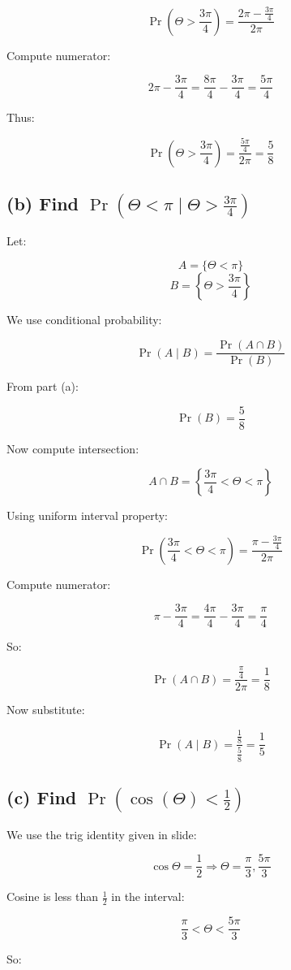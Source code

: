 \documentclass{article}
\begin{document}
\[
\Pr\left(\Theta>\frac{3\pi}{4}\right)=\frac{2\pi-\frac{3\pi}{4}}{2\pi}
\]

Compute numerator:

\[
2\pi-\frac{3\pi}{4}=\frac{8\pi}{4}-\frac{3\pi}{4}=\frac{5\pi}{4}
\]

Thus:

\[
\Pr\left(\Theta>\frac{3\pi}{4}\right)=\frac{\frac{5\pi}{4}}{2\pi}=\frac{5}{8}
\]

\subsection*{(b) Find $\Pr\left(\Theta<\pi\mid \Theta>\frac{3\pi}{4}\right)$}
Let:

\[
A=\{\Theta<\pi\}
\]
\[
B=\left\{\Theta>\frac{3\pi}{4}\right\}
\]

We use conditional probability:

\[
\Pr(A\mid B)=\frac{\Pr(A\cap B)}{\Pr(B)}
\]

From part (a):

\[
\Pr(B)=\frac{5}{8}
\]

Now compute intersection:

\[
A\cap B=\left\{\frac{3\pi}{4}<\Theta<\pi\right\}
\]

Using uniform interval property:

\[
\Pr\left(\frac{3\pi}{4}<\Theta<\pi\right)=\frac{\pi-\frac{3\pi}{4}}{2\pi}
\]

Compute numerator:

\[
\pi-\frac{3\pi}{4}=\frac{4\pi}{4}-\frac{3\pi}{4}=\frac{\pi}{4}
\]

So:

\[
\Pr(A\cap B)=\frac{\frac{\pi}{4}}{2\pi}=\frac{1}{8}
\]

Now substitute:

\[
\Pr(A\mid B)=\frac{\frac{1}{8}}{\frac{5}{8}}=\frac{1}{5}
\]

\subsection*{(c) Find $\Pr\left(\cos(\Theta)<\frac{1}{2}\right)$}
We use the trig identity given in slide:

\[
\cos\Theta=\frac{1}{2}\Rightarrow \Theta=\frac{\pi}{3},\frac{5\pi}{3}
\]

Cosine is less than $\frac{1}{2}$ in the interval:

\[
\frac{\pi}{3}<\Theta<\frac{5\pi}{3}
\]

So:
\end{document}
